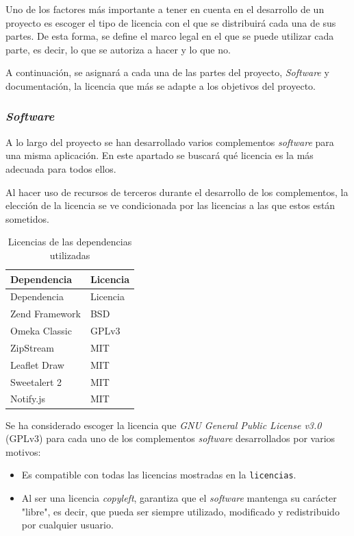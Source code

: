 \documentclass[
]{article}
\providecommand{\tightlist}{%
  \setlength{\itemsep}{0pt}\setlength{\parskip}{0pt}}
\begin{document}
Uno de los factores más importante a tener en cuenta en el desarrollo de
un proyecto es escoger el tipo de licencia con el que se distribuirá
cada una de sus partes. De esta forma, se define el marco legal en el
que se puede utilizar cada parte, es decir, lo que se autoriza a hacer y
lo que no.

A continuación, se asignará a cada una de las partes del proyecto,
\emph{Software} y documentación, la licencia que más se adapte a los
objetivos del proyecto.

\hypertarget{software}{%
\subsubsection{\texorpdfstring{\emph{Software}}{Software}}\label{software}}

A lo largo del proyecto se han desarrollado varios complementos
\emph{software} para una misma aplicación. En este apartado se buscará
qué licencia es la más adecuada para todos ellos.

Al hacer uso de recursos de terceros durante el desarrollo de los
complementos, la elección de la licencia se ve condicionada por las
licencias a las que estos están sometidos.

\begin{longtable}[]{@{}ll@{}}
\caption{Licencias de las dependencias utilizadas}\tabularnewline
\toprule
Dependencia & Licencia\tabularnewline
\midrule
\endfirsthead
\toprule
Dependencia & Licencia\tabularnewline
\midrule
\endhead
Zend Framework & BSD\tabularnewline
Omeka Classic & GPLv3\tabularnewline
ZipStream & MIT\tabularnewline
Leaflet Draw & MIT\tabularnewline
Sweetalert 2 & MIT\tabularnewline
Notify.js & MIT\tabularnewline
\bottomrule
\end{longtable}

Se ha considerado escoger la licencia que \emph{GNU General Public
License v3.0} (GPLv3) para cada uno de los complementos \emph{software}
desarrollados por varios motivos:

\begin{itemize}
\tightlist
\item
  Es compatible con todas las licencias mostradas en la
  \texttt{licencias}.
\item
  Al ser una licencia \emph{copyleft}, garantiza que el \emph{software}
  mantenga su carácter "libre", es decir, que pueda ser siempre
  utilizado, modificado y redistribuido por cualquier usuario.
\end{itemize}
\end{document}
